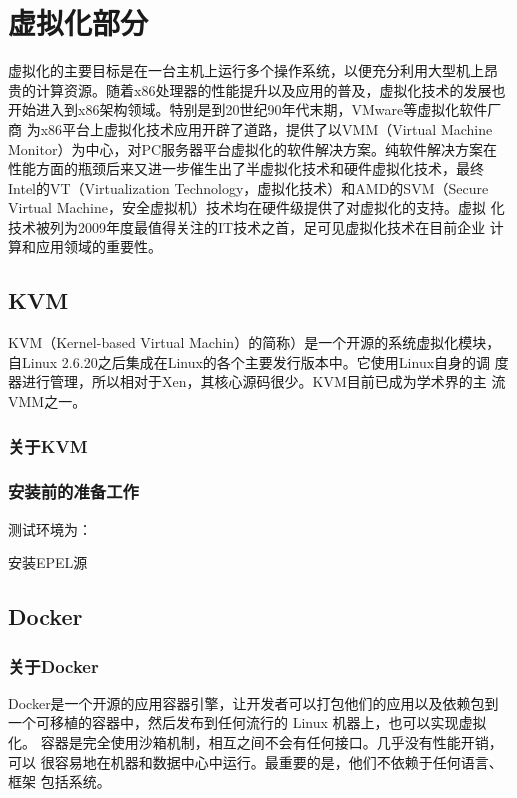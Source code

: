 \part{虚拟化部分}
\label{part:virtualization}

虚拟化的主要目标是在一台主机上运行多个操作系统，以便充分利用大型机上昂
贵的计算资源。随着x86处理器的性能提升以及应用的普及，虚拟化技术的发展也
开始进入到x86架构领域。特别是到20世纪90年代末期，VMware等虚拟化软件厂商
为x86平台上虚拟化技术应用开辟了道路，提供了以VMM（Virtual Machine
  Monitor）为中心，对PC服务器平台虚拟化的软件解决方案。纯软件解决方案在
性能方面的瓶颈后来又进一步催生出了半虚拟化技术和硬件虚拟化技术，最终
Intel的VT（Virtualization Technology，虚拟化技术）和AMD的SVM（Secure
  Virtual Machine，安全虚拟机）技术均在硬件级提供了对虚拟化的支持。虚拟
化技术被列为2009年度最值得关注的IT技术之首，足可见虚拟化技术在目前企业
计算和应用领域的重要性。

\chapter{KVM}
\label{chap:kvm}

KVM（Kernel-based Virtual Machin）的简称）是一个开源的系统虚拟化模块，
自Linux 2.6.20之后集成在Linux的各个主要发行版本中。它使用Linux自身的调
度器进行管理，所以相对于Xen，其核心源码很少。KVM目前已成为学术界的主
流VMM之一。

\section{关于KVM}
\label{sec:AboutKVM}

\section{安装前的准备工作}
\label{sec:kvmPrepare}

测试环境为：

安装EPEL源

\chapter{Docker}

\section{关于Docker}

Docker是一个开源的应用容器引擎，让开发者可以打包他们的应用以及依赖包到
一个可移植的容器中，然后发布到任何流行的 Linux 机器上，也可以实现虚拟化。
容器是完全使用沙箱机制，相互之间不会有任何接口。几乎没有性能开销，可以
很容易地在机器和数据中心中运行。最重要的是，他们不依赖于任何语言、框架
包括系统。

